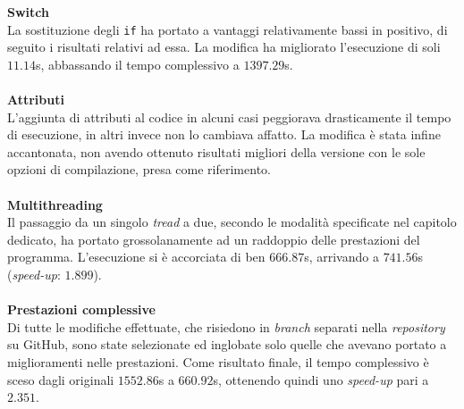 \textbf{Switch}\\
  La sostituzione degli \verb|if| ha portato a vantaggi relativamente bassi in 
  positivo, di seguito i risultati relativi ad essa.
  La modifica ha migliorato l'esecuzione di soli $11.14$s, abbassando il tempo 
  complessivo a $1397.29$s.
\\ \\
\textbf{Attributi}\\
  L'aggiunta di attributi al codice in alcuni casi peggiorava drasticamente il 
  tempo di esecuzione, in altri invece non lo cambiava affatto. La modifica è 
  stata infine accantonata, non avendo ottenuto risultati migliori della 
  versione con le sole opzioni di compilazione, presa come riferimento.
\\ \\
\textbf{Multithreading}\\
  Il passaggio da un singolo \emph{tread} a due, secondo le modalità 
  specificate nel capitolo dedicato, ha portato grossolanamente ad un raddoppio 
  delle prestazioni del programma. L'esecuzione si è accorciata di ben 
  $666.87$s, arrivando a $741.56$s (\textit{speed-up}: $1.899$).
\\ \\
\textbf{Prestazioni complessive}\\
  Di tutte le modifiche effettuate, che risiedono in \textit{branch} separati 
  nella \textit{repository} su GitHub, sono state selezionate ed inglobate solo 
  quelle che avevano portato a miglioramenti nelle prestazioni.
  Come risultato finale, il tempo complessivo è sceso dagli originali 
  $1552.86$s a $660.92$s, ottenendo quindi uno \textit{speed-up} pari a $2.351$.
    

